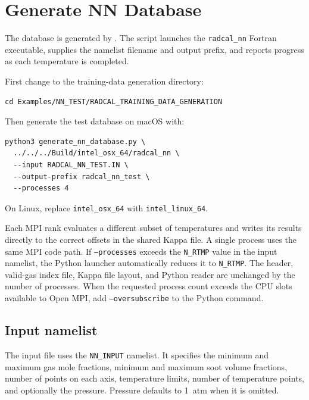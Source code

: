 \documentclass[11pt]{article}
\begin{document}
\section{Generate NN Database}

The database is generated by
.
The script launches the
\texttt{radcal\_nn} Fortran executable, supplies the namelist filename and
output prefix, and reports progress as each temperature is completed.

First change to the training-data generation directory:

\begin{verbatim}
cd Examples/NN_TEST/RADCAL_TRAINING_DATA_GENERATION
\end{verbatim}

Then generate the test database on macOS with:

\begin{verbatim}
python3 generate_nn_database.py \
  ../../../Build/intel_osx_64/radcal_nn \
  --input RADCAL_NN_TEST.IN \
  --output-prefix radcal_nn_test \
  --processes 4
\end{verbatim}

On Linux, replace \texttt{intel\_osx\_64} with
\texttt{intel\_linux\_64}.

Each MPI rank evaluates a different subset of temperatures and writes its
results directly to the correct offsets in the shared Kappa file. A single
process uses the same MPI code path. If \texttt{--processes} exceeds the
\texttt{N\_RTMP} value in the input namelist, the Python launcher
automatically reduces it to \texttt{N\_RTMP}. The
header, valid-gas index file, Kappa file layout, and Python reader are
unchanged by the number of processes.
When the requested process count exceeds the CPU slots available to Open MPI,
add \texttt{--oversubscribe} to the Python command.

\subsection{Input namelist}

The input file
uses the
\texttt{NN\_INPUT} namelist. It specifies the minimum and maximum gas mole
fractions, minimum and maximum soot volume fractions, number of points on each
axis, temperature limits, number of temperature points, and optionally the
pressure. Pressure defaults to 1~atm when it is omitted.
\end{document}

